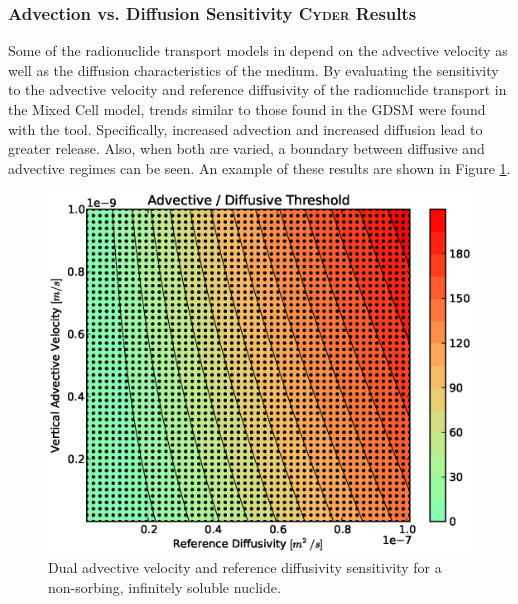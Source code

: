 
\subsubsection{Advection vs. Diffusion Sensitivity \textsc{Cyder} Results}
Some of the  radionuclide transport models in \Cyder depend on the advective velocity as well as the diffusion
characteristics of the medium. By evaluating the sensitivity to the advective velocity and reference
diffusivity of the radionuclide transport in the Mixed Cell model, trends similar to those found in the \gls{GDSM} were found with the \Cyder tool.
Specifically, increased advection and increased diffusion lead to greater release. Also, when both are varied, a boundary between diffusive and advective
regimes can be seen. An example of these results are shown in Figure
\ref{fig:dr_adv_diff}.

\begin{figure}[ht]
\centering
\includegraphics[width=\linewidth]{./results/images/adv_vel_diff.eps}
\caption[Advection vs. Diffusion Sensitivity in \textsc{Cyder}]{Dual advective velocity
and reference diffusivity sensitivity for a non-sorbing, infinitely soluble
nuclide.}
\label{fig:dr_adv_diff}
\end{figure}
